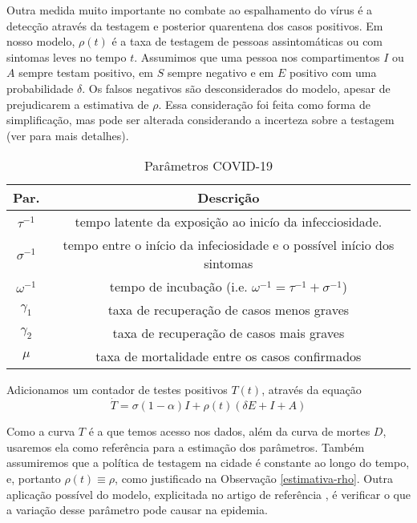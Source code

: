 Outra medida muito importante no combate ao espalhamento do vírus é a detecção através da testagem e posterior quarentena dos casos positivos.
Em nosso modelo, $\rho(t)$ é a taxa de testagem de pessoas assintomáticas ou com sintomas leves no tempo $t$. 
Assumimos que uma pessoa nos compartimentos $I$ ou $A$ sempre testam positivo, em $S$ sempre negativo e em $E$ positivo com uma probabilidade $\delta$. Os falsos negativos são desconsiderados do modelo, apesar de prejudicarem a estimativa de $\rho$. Essa consideração foi feita como forma de simplificação, mas pode ser alterada considerando a incerteza sobre a testagem (ver \cite[Remark 2.3]{aronna2021} para mais detalhes). 

\begin{table}[ht]
\centering
\begin{tabular}{|c|c|}
\hline
 {\bf Par.} & {\bf Descrição} \\[0.5ex]
\hline
  $ \tau^{-1}$  & tempo latente da exposição ao inicío da
  infecciosidade. \\[0.3ex]
\hline
    $\sigma^{-1}$ & 
    tempo entre o início da infeciosidade e o possível início dos sintomas
    \\[0.3ex]
\hline
     $\omega^{-1}$ & tempo de incubação (i.e. $\omega^{-1} = \tau^{-1} + \sigma^{-1} $)
     \\[0.3ex]
\hline
    $\gamma_1$ & taxa de recuperação de casos menos graves\\[0.3ex]
\hline
    $\gamma_2$ & taxa de recuperação de casos mais graves \\[0.3ex]
\hline
    $\mu$ & taxa de mortalidade entre os casos confirmados\\[0.3ex]
\hline
\end{tabular}
\caption{Parâmetros {COVID-19}}
\label{Tab:ParPathogen}
\end{table}

Adicionamos um contador de testes positivos $T(t)$, através da equação
\begin{equation}
    \label{counting}
    \dot T = \sigma(1-\alpha)I + \rho(t) (\delta E + I + A) 
\end{equation}

Como a curva $T$ é a que temos acesso nos dados, além da curva de mortes $D$, usaremos ela como referência para a estimação dos parâmetros. Também assumiremos que a política de testagem na cidade é constante ao longo do tempo, e, portanto $\rho(t) \equiv \rho$, como justificado na Observação \ref{estimativa-rho}. Outra aplicação possível do modelo,
explicitada no artigo de referência \cite{aronna2021}, é verificar o que a
variação desse parâmetro pode causar na epidemia. 

